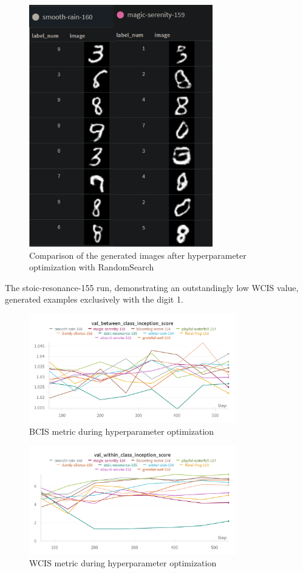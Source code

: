 \documentclass[lettersize,journal]{IEEEtran}
\begin{document}
\begin{figure}[h]
    \centering
    \includegraphics[width=8cm]{gen_images_cmp.png}
    \caption{Comparison of the generated images after hyperparameter optimization with RandomSearch}
    \label{fig_4}
\end{figure}

The stoic-resonance-155 run, demonstrating an outstandingly low WCIS value, generated examples exclusively with the digit 1.

\begin{figure}[h]
    \centering
    \includegraphics[width=9cm]{wnb_min_bcis.png}
    \caption{BCIS metric during hyperparameter optimization}
\end{figure}
\newpage

\begin{figure}[h]
    \centering
    \includegraphics[width=9cm]{wnb_min_wcsi.png}
    \caption{WCIS metric during hyperparameter optimization}
\end{figure}
\end{document}

